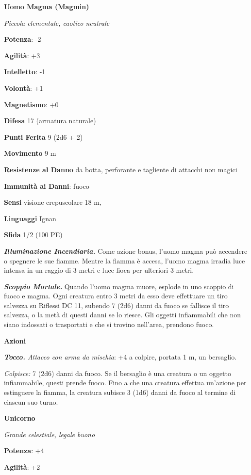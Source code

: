 \begin{multicols}{2}
\textbf{Uomo Magma (Magmin)}

\emph{Piccola elementale, caotico neutrale}

\textbf{Potenza}: -2

\textbf{Agilità}: +3

\textbf{Intelletto}: -1

\textbf{Volontà}: +1

\textbf{Magnetismo}: +0

\textbf{Difesa} 17 (armatura naturale)

\textbf{Punti Ferita} 9 (2d6 + 2)

\textbf{Movimento} 9 m

\textbf{Resistenze al Danno} da botta, perforante e tagliente di
attacchi non magici

\textbf{Immunità ai Danni}: fuoco

\textbf{Sensi} visione crepuscolare 18 m, 

\textbf{Linguaggi} Ignan

\textbf{Sfida} 1/2 (100 PE)\smallskip

\emph{\textbf{Illuminazione Incendiaria.}} Come azione bonus, l'uomo
magma può accendere o spegnere le sue fiamme. Mentre la fiamma è accesa,
l'uomo magma irradia luce intensa in un raggio di 3 metri e luce fioca
per ulteriori 3 metri.

\emph{\textbf{Scoppio Mortale.}} Quando l'uomo magma muore, esplode in
uno scoppio di fuoco e magma. Ogni creatura entro 3 metri da esso deve
effettuare un tiro salvezza su Riflessi DC 11, subendo 7 (2d6) danni da
fuoco se fallisce il tiro salvezza, o la metà di questi danni se lo
riesce. Gli oggetti infiammabili che non siano indossati o trasportati e
che si trovino nell'area, prendono fuoco.

\smallskip\textbf{Azioni}

\emph{\textbf{Tocco.} Attacco con arma da mischia}: +4 a colpire,
portata 1 m, un bersaglio.

\emph{Colpisce:} 7 (2d6) danni da fuoco. Se il bersaglio è una creatura
o un oggetto infiammabile, questi prende fuoco. Fino a che una creatura
effettua un'azione per estinguere la fiamma, la creatura subisce 3 (1d6)
danni da fuoco al termine di ciascun suo turno.

\textbf{Unicorno}

\emph{Grande celestiale, legale buono}

\textbf{Potenza}: +4

\textbf{Agilità}: +2


\end{multicols}
